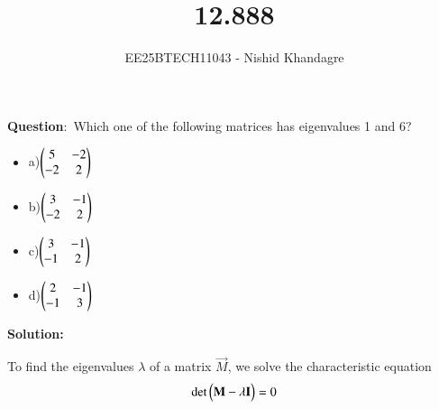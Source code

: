 \documentclass[journal]{IEEEtran}
\title{12.888}
\author{EE25BTECH11043 - Nishid Khandagre}
\begin{document}
\maketitle

\renewcommand{\thefigure}{\theenumi}
\renewcommand{\thetable}{\theenumi}


\textbf{Question}:\
Which one of the following matrices has eigenvalues 1 and 6?

\begin{itemize}
\item a)$\begin{pmatrix}5&-2\\-2&2\end{pmatrix}$
\item b)$\begin{pmatrix}3&-1\\-2&2\end{pmatrix}$
\item c)$\begin{pmatrix}3&-1\\-1&2\end{pmatrix}$
\item d)$\begin{pmatrix}2&-1\\-1&3\end{pmatrix}$
\end{itemize}

\textbf{Solution: }

To find the eigenvalues $\lambda$ of a matrix $\vec{M}$, we solve the characteristic equation 
\begin{align}
\det\begin{pmatrix}\mathbf{M} - \lambda \mathbf{I}\end{pmatrix} = 0
\end{align}
\end{document}
